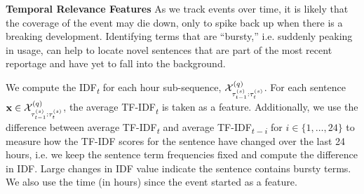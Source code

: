 \textbf{Temporal Relevance Features}
As we track events over time, it is likely that the coverage of the event 
may die down, only to spike back up when there is a breaking development.
Identifying terms that are ``bursty,'' i.e. suddenly peaking in usage,
can help to locate novel sentences that are part of the most recent reportage
and have yet to fall into the background.

We compute the IDF\textsubscript{$t$} for each hour sub-sequence, $\mathcal{X}^{(q)}_{\tau^{(s)}_{t-1}:\tau^{(s)}_{t}}$. For each sentence $\mathbf{x} \in \mathcal{X}^{(q)}_{\tau^{(s)}_{t-1}:\tau^{(s)}_{t}}$, the 
average TF-IDF\textsubscript{$t$} is taken as a feature. Additionally, 
we use the difference between average TF-IDF\textsubscript{$t$} and average TF-IDF\textsubscript{$t-i$}  for 
$i \in \{1, \ldots, 24\}$ to measure how the TF-IDF scores for the sentence have
changed over the last 24 hours, i.e. we keep the sentence term frequencies 
fixed and compute the difference in IDF. Large changes in IDF value indicate 
the sentence contains bursty terms.
We also use the time (in hours) since the event started as a feature.


